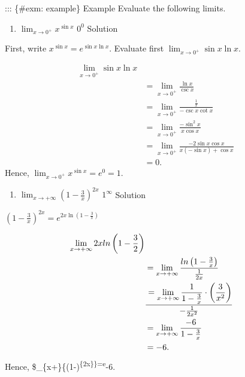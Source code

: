 \documentclass[
  letterpaper,
  DIV=11,
  numbers=noendperiod]{scrartcl}
\providecommand{\tightlist}{%
  \setlength{\itemsep}{0pt}\setlength{\parskip}{0pt}}\usepackage{longtable,booktabs,array}
\begin{document}
::: \{\#exm: example\} Example Evaluate the following limits.

\begin{enumerate}
\def\labelenumi{\arabic{enumi}.}
\tightlist
\item
  \(\displaystyle\lim_{x\to 0^+}{x^{\sin x}}\) \(0^0\) Solution
\end{enumerate}

First, write \(x^{\sin x}=e^{\sin x \ln x}\). Evaluate first
\(\displaystyle\lim_{x\to 0^+}{\sin x \ln x}\).

\[
\begin{aligned}
\displaystyle\lim_{x\to 0^+}{\sin x \ln x}\\&=\displaystyle\lim_{x\to 0^+}{\frac{\ln x}{\csc x}}\\&=\displaystyle\lim_{x\to 0^+}{\frac{\frac{1}{x}}{-\csc x \cot x}}\\&=\displaystyle\lim_{x\to 0^+}{\frac{-\sin^2 x}{x \cos x}}\\&=\displaystyle\lim_{x\to 0^+}{\frac{-2\sin x \cos x}{x(-\sin x)+\cos x}}\\&=0.
\end{aligned}
\] Hence, \(\displaystyle\lim_{x\to 0^+}{x^{\sin x}}=e^0=1\).

\begin{enumerate}
\def\labelenumi{\arabic{enumi}.}
\setcounter{enumi}{1}
\tightlist
\item
  \(\displaystyle\lim_{x\to +\infty}{\left(1-\frac{3}{x}\right)^{2x}}\)
  \(1^\infty\) Solution
\end{enumerate}

\(\left(1-\frac{3}{x}\right)^{2x}=e^{2x\ln \left(1-\frac{3}{x}\right)}\)

\[
\begin{aligned}
\displaystyle\lim_{x\to +\infty}{2x ln \left(1-\frac{3}{2}\right)}\\&=\displaystyle\lim_{x\to +\infty}{\frac{ln \left(1-\frac{3}{x}\right)}{\frac{1}{2x}}}\\&=\displaystyle\lim_{x\to +\infty}{\frac{1}{1-\frac{3}{x}}}\cdot \left(\frac{3}{x^2}\right)\over-\frac{1}{2x^2}\\&=\displaystyle\lim_{x\to +\infty}{\frac{-6}{1-\frac{3}{x}}}\\&=-6.
\end{aligned}
\] Hence,
\$\displaystyle\lim\_\{x\to +\infty\}\{\left(1-\right)\textsuperscript{\{2x\}\}=e}-6.
\end{document}

